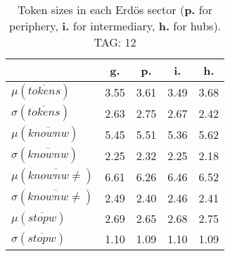\begin{table}[h!]
\begin{center}
\begin{tabular}{| l || c | c | c | c |}\hline
 & {\bf g.} & {\bf p.} & {\bf i.} & {\bf h.} \\\hline\hline
$\mu(\overline{tokens})$ & 3.55  & 3.61  & 3.49  & 3.68 \\
$\sigma(\overline{tokens})$ & 2.63  & 2.75  & 2.67  & 2.42 \\\hline
$\mu(\overline{knownw})$ & 5.45  & 5.51  & 5.36  & 5.62 \\
$\sigma(\overline{knownw})$ & 2.25  & 2.32  & 2.25  & 2.18 \\\hline
$\mu(\overline{knownw \neq})$ & 6.61  & 6.26  & 6.46  & 6.52 \\
$\sigma(\overline{knownw \neq})$ & 2.49  & 2.40  & 2.46  & 2.41 \\\hline
$\mu(\overline{stopw})$ & 2.69  & 2.65  & 2.68  & 2.75 \\
$\sigma(\overline{stopw})$ & 1.10  & 1.09  & 1.10  & 1.09 \\\hline
\end{tabular}
\caption{Token sizes in each Erd\"os sector ({{\bf p.}} for periphery, {{\bf i.}} for intermediary, {{\bf h.}} for hubs). TAG: 12}
\end{center}
\end{table}